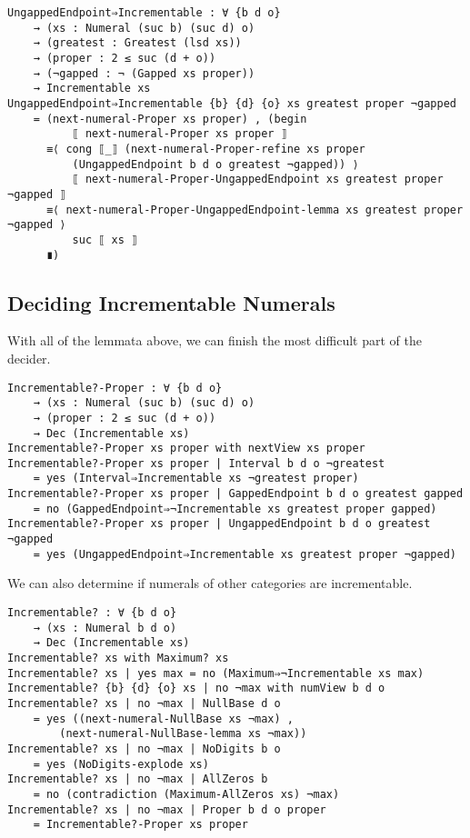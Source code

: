 \documentclass[\main/thesis.tex]{subfiles}
\begin{document}
\begin{lstlisting}[basicstyle=\ttfamily\scriptsize]
UngappedEndpoint⇒Incrementable : ∀ {b d o}
    → (xs : Numeral (suc b) (suc d) o)
    → (greatest : Greatest (lsd xs))
    → (proper : 2 ≤ suc (d + o))
    → (¬gapped : ¬ (Gapped xs proper))
    → Incrementable xs
UngappedEndpoint⇒Incrementable {b} {d} {o} xs greatest proper ¬gapped
    = (next-numeral-Proper xs proper) , (begin
          ⟦ next-numeral-Proper xs proper ⟧
      ≡⟨ cong ⟦_⟧ (next-numeral-Proper-refine xs proper
          (UngappedEndpoint b d o greatest ¬gapped)) ⟩
          ⟦ next-numeral-Proper-UngappedEndpoint xs greatest proper ¬gapped ⟧
      ≡⟨ next-numeral-Proper-UngappedEndpoint-lemma xs greatest proper ¬gapped ⟩
          suc ⟦ xs ⟧
      ∎)
\end{lstlisting}

\subsection{Deciding Incrementable Numerals}

With all of the lemmata above, we can finish the most difficult part
of the decider.

\begin{lstlisting}[basicstyle=\ttfamily\scriptsize]
Incrementable?-Proper : ∀ {b d o}
    → (xs : Numeral (suc b) (suc d) o)
    → (proper : 2 ≤ suc (d + o))
    → Dec (Incrementable xs)
Incrementable?-Proper xs proper with nextView xs proper
Incrementable?-Proper xs proper | Interval b d o ¬greatest
    = yes (Interval⇒Incrementable xs ¬greatest proper)
Incrementable?-Proper xs proper | GappedEndpoint b d o greatest gapped
    = no (GappedEndpoint⇒¬Incrementable xs greatest proper gapped)
Incrementable?-Proper xs proper | UngappedEndpoint b d o greatest ¬gapped
    = yes (UngappedEndpoint⇒Incrementable xs greatest proper ¬gapped)
\end{lstlisting}

We can also determine if numerals of other categories are incrementable.

\begin{lstlisting}
Incrementable? : ∀ {b d o}
    → (xs : Numeral b d o)
    → Dec (Incrementable xs)
Incrementable? xs with Maximum? xs
Incrementable? xs | yes max = no (Maximum⇒¬Incrementable xs max)
Incrementable? {b} {d} {o} xs | no ¬max with numView b d o
Incrementable? xs | no ¬max | NullBase d o
    = yes ((next-numeral-NullBase xs ¬max) ,
        (next-numeral-NullBase-lemma xs ¬max))
Incrementable? xs | no ¬max | NoDigits b o
    = yes (NoDigits-explode xs)
Incrementable? xs | no ¬max | AllZeros b
    = no (contradiction (Maximum-AllZeros xs) ¬max)
Incrementable? xs | no ¬max | Proper b d o proper
    = Incrementable?-Proper xs proper
\end{lstlisting}
\end{document}
